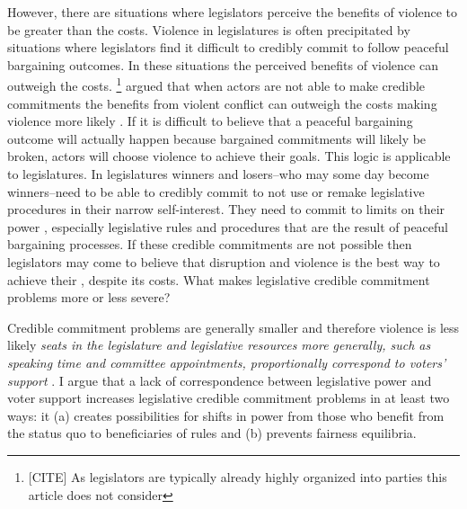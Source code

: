 \documentclass[a4paper]{article}\usepackage[]{graphicx}\usepackage[]{color}
\begin{document}
However, there are situations where legislators perceive the benefits of violence to be greater than the costs. Violence in  legislatures is often precipitated by situations where legislators find it difficult to credibly commit to follow peaceful bargaining outcomes. In these situations the perceived benefits of violence can outweigh the costs. 
\footnote{ [CITE] As legislators are typically already highly organized into parties this article does not consider }
\cite{Fearon1995} argued that when actors are not able to make credible commitments the benefits from violent conflict can outweigh the costs making violence more likely \cite[see also][]{Powell2006}. If it is difficult to believe that a peaceful bargaining outcome will actually happen because bargained commitments will likely be broken, actors will choose violence to achieve their goals. This logic is applicable to legislatures. In  legislatures winners and losers--who may some day become winners--need to be able to credibly commit to not use or remake legislative procedures in their narrow self-interest. They need to commit to limits on their power \citep{riker1982,Gaubatz1996}, especially legislative rules and procedures that are the result of peaceful bargaining processes.  If these credible commitments are not possible then legislators may come to believe that disruption and violence is the best way to achieve their , despite its costs. What makes legislative credible commitment problems more or less severe?

Credible commitment problems are generally smaller and therefore violence is less likely \emph{ seats in the legislature and legislative resources more generally, such as speaking time and committee appointments, proportionally correspond to voters' support }.   I argue that a lack of correspondence between legislative power and voter support increases legislative credible commitment problems in at least two ways: it (a) creates possibilities for shifts in power from those who benefit from the status quo to beneficiaries of  rules  and (b) prevents fairness equilibria.
\end{document}
